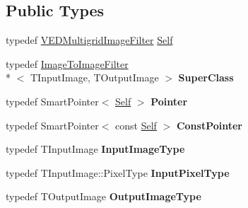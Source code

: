 \subsection*{Public Types}
\begin{DoxyCompactItemize}
\item 
typedef \hyperlink{classitk_1_1_v_e_d_multigrid_image_filter}{V\-E\-D\-Multigrid\-Image\-Filter} \hyperlink{classitk_1_1_v_e_d_multigrid_image_filter_a4e79c36d98793a398699ebf672d78762}{Self}
\item 
\hypertarget{classitk_1_1_v_e_d_multigrid_image_filter_a2c8aaf15075eb5b1471b156af0a08328}{typedef \hyperlink{class_image_to_image_filter}{Image\-To\-Image\-Filter}\\*
$<$ T\-Input\-Image, T\-Output\-Image $>$ {\bfseries Super\-Class}}\label{classitk_1_1_v_e_d_multigrid_image_filter_a2c8aaf15075eb5b1471b156af0a08328}

\item 
\hypertarget{classitk_1_1_v_e_d_multigrid_image_filter_afb9004352b203770df9249e506eda3cf}{typedef Smart\-Pointer$<$ \hyperlink{classitk_1_1_v_e_d_multigrid_image_filter_a4e79c36d98793a398699ebf672d78762}{Self} $>$ {\bfseries Pointer}}\label{classitk_1_1_v_e_d_multigrid_image_filter_afb9004352b203770df9249e506eda3cf}

\item 
\hypertarget{classitk_1_1_v_e_d_multigrid_image_filter_a0f1b52d57947e4d1fa9e23f1b4bc5ad3}{typedef Smart\-Pointer$<$ const \hyperlink{classitk_1_1_v_e_d_multigrid_image_filter_a4e79c36d98793a398699ebf672d78762}{Self} $>$ {\bfseries Const\-Pointer}}\label{classitk_1_1_v_e_d_multigrid_image_filter_a0f1b52d57947e4d1fa9e23f1b4bc5ad3}

\item 
\hypertarget{classitk_1_1_v_e_d_multigrid_image_filter_a86196537f4b1494ef84c83cf1ea966d5}{typedef T\-Input\-Image {\bfseries Input\-Image\-Type}}\label{classitk_1_1_v_e_d_multigrid_image_filter_a86196537f4b1494ef84c83cf1ea966d5}

\item 
\hypertarget{classitk_1_1_v_e_d_multigrid_image_filter_a43db82edf24ce3e881142d94b060c0c2}{typedef T\-Input\-Image\-::\-Pixel\-Type {\bfseries Input\-Pixel\-Type}}\label{classitk_1_1_v_e_d_multigrid_image_filter_a43db82edf24ce3e881142d94b060c0c2}

\item 
\hypertarget{classitk_1_1_v_e_d_multigrid_image_filter_ab44f3479119b729cb49ce3f1765c0708}{typedef T\-Output\-Image {\bfseries Output\-Image\-Type}}\label{classitk_1_1_v_e_d_multigrid_image_filter_ab44f3479119b729cb49ce3f1765c0708}


\end{DoxyCompactItemize}
